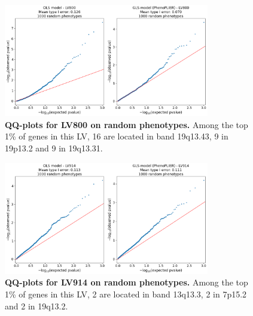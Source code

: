 \documentclass[
  a4paper,
]{article}
\newenvironment{fignos:tagged-figure}[1][]{
  \let\oldfigurename\figurename
  \renewcommand{\figurename}{Supplementary Figure}
}{
  \let\figurename\oldfigurename
}
\begin{document}
\begin{fignos:tagged-figure}[S5]

\begin{figure}
\hypertarget{fig:reg:nulls:qqplot:lv800}{%
\centering
\includegraphics[width=0.8\textwidth,height=\textheight]{images/gls/null_sims/models_lv800.png}
\caption{\textbf{QQ-plots for LV800 on random phenotypes.}
Among the top 1\% of genes in this LV, 16 are located in band 19q13.43, 9 in 19p13.2 and 9 in 19q13.31.}\label{fig:reg:nulls:qqplot:lv800}
}
\end{figure}

\end{fignos:tagged-figure}

\begin{fignos:tagged-figure}[S6]

\begin{figure}
\hypertarget{fig:reg:nulls:qqplot:lv914}{%
\centering
\includegraphics[width=0.8\textwidth,height=\textheight]{images/gls/null_sims/models_lv914.png}
\caption{\textbf{QQ-plots for LV914 on random phenotypes.}
Among the top 1\% of genes in this LV, 2 are located in band 13q13.3, 2 in 7p15.2 and 2 in 19q13.2.}\label{fig:reg:nulls:qqplot:lv914}
}
\end{figure}

\end{fignos:tagged-figure}
\end{document}
